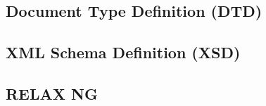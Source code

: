 \subsection{Document Type Definition (DTD)}


\subsection{XML Schema Definition (XSD)}
%

\subsection{RELAX NG}
%